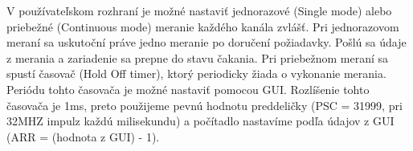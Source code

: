 \documentclass[main.tex]{subfiles}
\begin{document}
	V používateľskom rozhraní je možné nastaviť jednorazové (Single mode) alebo priebežné (Continuous mode) meranie každého kanála zvlášť. Pri jednorazovom meraní sa uskutoční práve jedno meranie po doručení požiadavky. Pošlú sa údaje z merania a zariadenie sa prepne do stavu čakania. Pri priebežnom meraní sa spustí časovač (Hold Off timer), ktorý periodicky žiada o vykonanie merania. Periódu tohto časovača je možné nastaviť pomocou GUI. Rozlíšenie tohto časovača je 1ms, preto použijeme pevnú hodnotu preddeličky (PSC = 31999, pri 32MHZ impulz každú milisekundu) a počítadlo nastavíme podľa údajov z GUI (ARR = (hodnota z GUI) - 1). 
	
	
\end{document}
